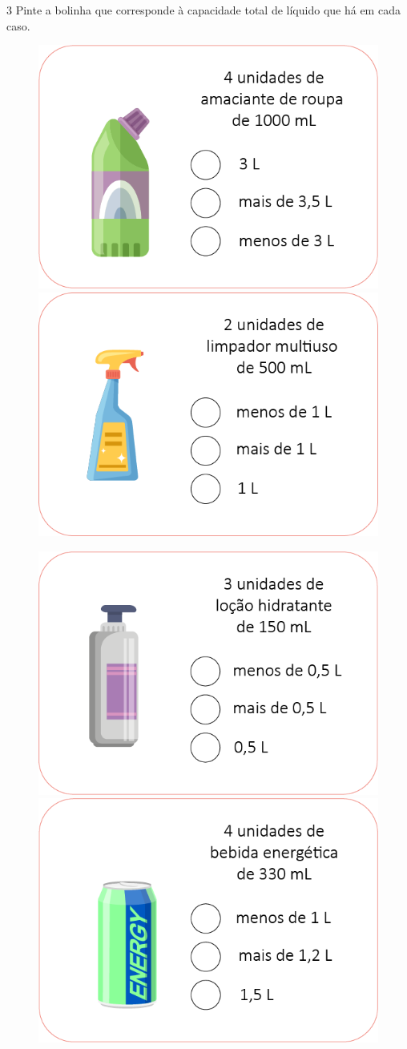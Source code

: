 \num{3} Pinte a bolinha que corresponde à capacidade total de líquido que há em cada caso.

\begin{figure}[htpb!]
\includegraphics[width=.5\textwidth]{media/image21.png}
\includegraphics[width=.5\textwidth]{media/image22.png}
\end{figure}

\pagebreak
\begin{figure}[htpb!]
\includegraphics[width=.5\textwidth]{media/image23.png}
\includegraphics[width=.5\textwidth]{media/image24.png}
\end{figure}

